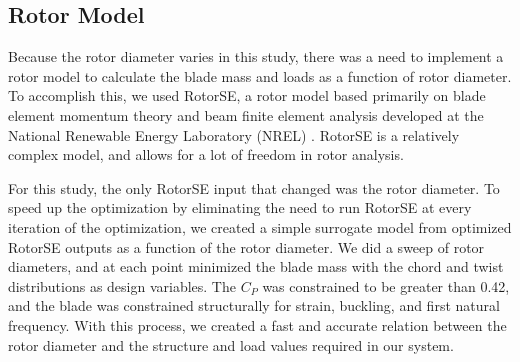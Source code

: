 \documentclass[conf]{new-aiaa}
\begin{document}
\subsection{Rotor Model}
Because the rotor diameter varies in this study, there was a need to implement a rotor model to calculate the blade mass and loads as a function of rotor diameter. To accomplish this, we used RotorSE,  a rotor model based primarily on blade element momentum theory and beam finite element analysis developed at the National Renewable Energy Laboratory (NREL) \cite{ning2013rotorse}. RotorSE is a relatively complex model, and allows for a lot of freedom in rotor analysis. 

For this study, the only RotorSE input that changed was the rotor diameter. To speed up the optimization by eliminating the need to run RotorSE at every iteration of the optimization, we created a simple surrogate model from optimized RotorSE outputs as a function of the rotor diameter. We did a sweep of rotor diameters, and at each point minimized the blade mass with the chord and twist distributions as design variables. The $C_P$ was constrained to be greater than 0.42, and the blade was constrained structurally for strain, buckling, and first natural frequency. With this process, we created a fast and accurate relation between the rotor diameter and the structure and load values required in our system.
\end{document}
